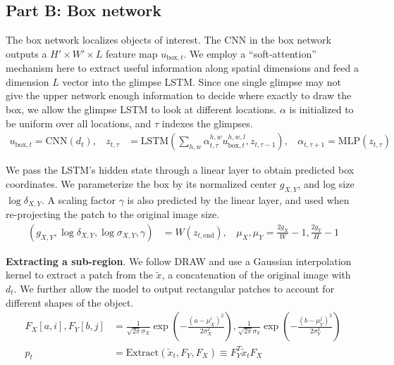 \subsection{Part B: Box network}

The box network localizes objects of interest. The CNN in the box network
outputs a $H' \times W' \times L$ feature map $u_{\text{box}, t}$. We employ a
``soft-attention'' mechanism here to extract useful information along spatial
dimensions and feed a dimension $L$ vector into the glimpse LSTM. Since one
single glimpse may not give the upper network enough information to decide
where exactly to draw the box, we allow the glimpse LSTM to look at different
locations.  $\alpha$ is  initialized to be uniform over all locations, and
$\tau$ indexes the glimpses.
\vspace{-1pt}
\begin{align}
u_{\text{box},t} = \text{CNN}(d_t), \ \ \ \
z_{t, \tau} &= \text{LSTM} (
\sum_{h, w} \alpha^{h, w}_{t, \tau} u^{h,w,l}_{\text{box},t}, z_{t, \tau-1} ), \ \ \ \
\alpha_{t, \tau+1} = \text{MLP}(z_{t, \tau})
\end{align}
\vspace{-6pt}

We pass the LSTM's hidden state through a linear layer to obtain predicted
box coordinates. We parameterize the box by its normalized center
$g_{X,Y}$, and log size $\log \delta_{X,Y}$. A scaling factor $\gamma$ is
also predicted by the linear layer, and used when re-projecting the patch
to the original image size.
\vspace{-1pt}
\begin{align}
(g_{X,Y}, \log \delta_{X,Y}, \log \sigma_{X,Y}, \gamma) &= W(z_{t, \text{end}}), \ \ \ \
\mu_X, \mu_Y = \frac{2g_X}{W} - 1, \frac{2g_Y}{H} - 1
\end{align}
\vspace{-6pt}

\textbf{Extracting a sub-region}. We follow DRAW \cite{gregor15draw} and use a
Gaussian interpolation kernel to extract a patch from the $\tilde{x}$, a
concatenation of the original image with $d_t$. We further allow the model to
output rectangular patches to account for different shapes of the object.
\begin{align}
F_X[a, i], F_Y[b, j] &= \frac{1}{\sqrt{2\pi} \sigma_X} \exp \left(- \frac{(a -
\mu_X^i)^2}{2\sigma_X^2} \right),
\frac{1}{\sqrt{2\pi} \sigma_Y} \exp \left(- \frac{(b -
\mu_Y^j)^2}{2\sigma_Y^2} \right) \\
p_t &= \text{Extract}(\tilde{x}_t, F_Y, F_X) \equiv F_Y^T \tilde{x}_t F_X
\end{align}

